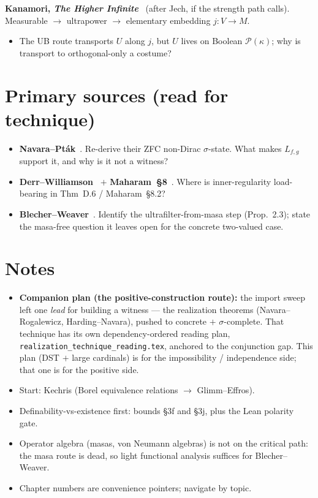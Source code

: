 \noindent\textbf{Kanamori, \emph{The Higher Infinite}}~\cite{Kanamori2009} (after Jech, if
the strength path calls). Measurable $\to$ ultrapower $\to$ elementary embedding
$j\colon V\to M$.
\begin{itemize}[leftmargin=*]
  \item The UB route transports $U$ along $j$, but $U$ lives on Boolean
    $\mathcal{P}(\kappa)$; why is transport to orthogonal-only a costume?
\end{itemize}

\section{Primary sources (read for technique)}

\begin{itemize}[leftmargin=*]
  \item \textbf{Navara--Pt\'ak}~\cite{NavaraPtak1983}. Re-derive their ZFC non-Dirac
    $\sigma$-state. What makes $L_{f,g}$ support it, and why is it not a witness?
  \item \textbf{Derr--Williamson}~\cite{DerrWilliamson2023} $+$
    \textbf{Maharam~\S8}~\cite{Maharam1972}. Where is inner-regularity load-bearing in
    Thm~D.6 / Maharam~\S8.2?
  \item \textbf{Blecher--Weaver}~\cite{BlecherWeaver2017}. Identify the
    ultrafilter-from-masa step (Prop.~2.3); state the masa-free question it leaves open for
    the concrete two-valued case.
\end{itemize}

\section{Notes}

\begin{itemize}[leftmargin=*]
  \item \textbf{Companion plan (the positive-construction route):} the
    import sweep left one \emph{lead} for building a witness --- the realization
    theorems (Navara--Rogalewicz, Harding--Navara), pushed to concrete $+$
    $\sigma$-complete. That technique has its own dependency-ordered reading plan,
    \texttt{realization\_technique\_reading.tex}, anchored to the conjunction gap. This
    plan (DST $+$ large cardinals) is for the impossibility / independence side; that one
    is for the positive side.
  \item Start: Kechris (Borel equivalence relations $\to$ Glimm--Effros).
  \item Definability-vs-existence first: bounds \S3f and \S3j, plus the Lean polarity gate.
  \item Operator algebra (masas, von Neumann algebras) is not on the critical path: the
    masa route is dead, so light functional analysis suffices for Blecher--Weaver.
  \item Chapter numbers are convenience pointers; navigate by topic.
\end{itemize}
